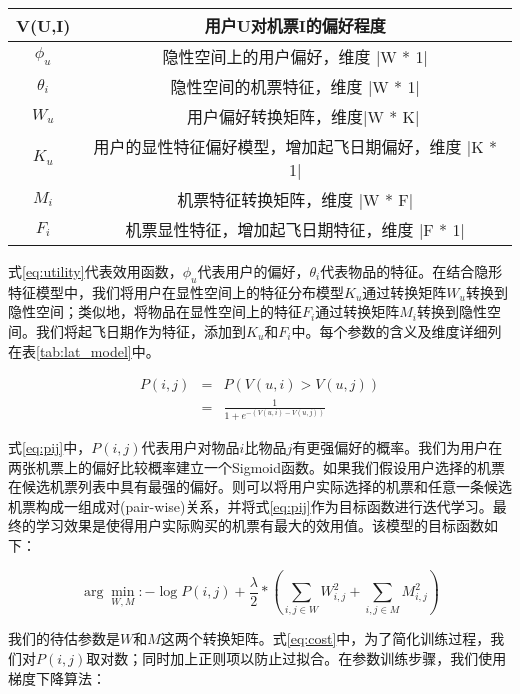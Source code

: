 \begin{table}[!hpb]
  \centering
  \begin{tabular}{|c|c|} \hline 
V(U,I) & 用户U对机票I的偏好程度 \\ \hline
$\phi_u$ & 隐性空间上的用户偏好，维度 |W * 1| \\ \hline
$\theta_i$ & 隐性空间的机票特征，维度 |W * 1| \\ \hline
$W_u$ &　用户偏好转换矩阵，维度|W * K| \\ \hline
$K_u$ & 用户的显性特征偏好模型，增加起飞日期偏好，维度 |K * 1| \\ \hline
$M_i$ & 机票特征转换矩阵，维度 |W * F| \\ \hline
$F_i$ & 机票显性特征，增加起飞日期特征，维度 |F * 1| \\ \hline
  \end{tabular}
\end{table}

式\ref{eq:utility}代表效用函数，$\phi_u$代表用户的偏好，$\theta_i$代表物品的特征。在结合隐形特征模型中，我们将用户在显性空间上的特征分布模型$K_u$通过转换矩阵$W_u$转换到隐性空间；类似地，将物品在显性空间上的特征$F_i$通过转换矩阵$M_i$转换到隐性空间。我们将起飞日期作为特征，添加到$K_u$和$F_i$中。每个参数的含义及维度详细列在表\ref{tab:lat_model}中。

\begin{eqnarray}
\label{eq:pij}
    P(i,j) & = & P(V(u,i) > V(u,j)) \nonumber \\
	 & = &\frac{1}{1+e^{-(V(u,i) - V(u,j))}}
\end{eqnarray}

式\ref{eq:pij}中，$P(i,j)$代表用户对物品$i$比物品$j$有更强偏好的概率。我们为用户在两张机票上的偏好比较概率建立一个Sigmoid函数\parencite{jingfan1997novel}。如果我们假设用户选择的机票在候选机票列表中具有最强的偏好。则可以将用户实际选择的机票和任意一条候选机票构成一组成对(pair-wise)关系，并将式\ref{eq:pij}作为目标函数进行迭代学习。最终的学习效果是使得用户实际购买的机票有最大的效用值。该模型的目标函数如下：

\begin{equation}
\label{eq:cost}
  \arg\min_{W,M} : - \log P(i,j) + \frac{\lambda}{2} * (\sum_{i,j \in W}W_{i,j}^2 + \sum_{i,j \in M}M_{i,j}^2)
\end{equation}

我们的待估参数是$W$和$M$这两个转换矩阵。式\ref{eq:cost}中，为了简化训练过程，我们对$P(i,j)$取对数；同时加上正则项以防止过拟合。在参数训练步骤，我们使用梯度下降算法：


